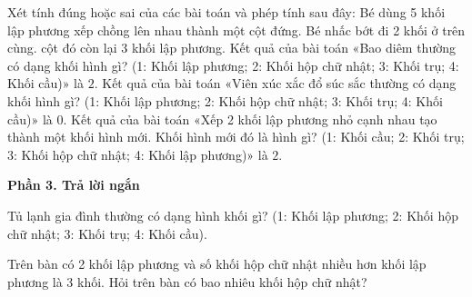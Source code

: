 \begin{ex} %
Xét tính đúng hoặc sai của các bài toán và phép tính sau đây:
\choiceTF
{\True Bé dùng 5 khối lập phương xếp chồng lên nhau thành một cột đứng. Bé nhấc bớt đi 2 khối ở trên cùng. cột đó còn lại $3$ khối lập phương.}
{\True Kết quả của bài toán «Bao diêm thường có dạng khối hình gì? (1: Khối lập phương; 2: Khối hộp chữ nhật; 3: Khối trụ; 4: Khối cầu)» là $2$.}
{Kết quả của bài toán «Viên xúc xắc đổ súc sắc thường có dạng khối hình gì? (1: Khối lập phương; 2: Khối hộp chữ nhật; 3: Khối trụ; 4: Khối cầu)» là $0$.}
{Kết quả của bài toán «Xếp 2 khối lập phương nhỏ cạnh nhau tạo thành một khối hình mới. Khối hình mới đó là hình gì? (1: Khối cầu; 2: Khối trụ; 3: Khối hộp chữ nhật; 4: Khối lập phương)» là $2$.}
\end{ex}

\textbf{Phần 3. Trả lời ngắn}

\begin{ex} %
Tủ lạnh gia đình thường có dạng hình khối gì? (1: Khối lập phương; 2: Khối hộp chữ nhật; 3: Khối trụ; 4: Khối cầu).
\end{ex}

\begin{ex} %
Trên bàn có 2 khối lập phương và số khối hộp chữ nhật nhiều hơn khối lập phương là 3 khối. Hỏi trên bàn có bao nhiêu khối hộp chữ nhật?
\end{ex}

